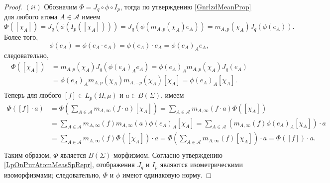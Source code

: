 \documentclass[12pt]{article}
\begin{document}
\begin{proof}
    $(ii)$ Обозначим $\Phi=J_q\circ \phi\circ I_p$, тогда по 
    утверждению \ref{GnrlzdMeanProp} для любого атома $A\in\mathcal{A}$ имеем
    \[
        \Phi([\chi_A])
        =J_q(\phi(I_p([\chi_A])))
        =J_q(\phi(m_{A,p}(\chi_A)e_A))
        =m_{A,p}(\chi_A)J_q(\phi(e_A)).
    \]
    Более того,
    \[
        \phi(e_A)
        =\phi(e_A\cdot e_A)
        =\phi(e_A)\cdot e_A
        =\phi(e_A)_A e_A,
    \]
    следовательно,
    \[
    \begin{aligned}
        \Phi([\chi_A])
        &=m_{A,p}(\chi_A)J_q(\phi(e_A)_A e_A) 
        =\phi(e_A)_A m_{A,p}(\chi_A)J_q( e_A) \\
        &=\phi(e_A)_A m_{A,p}(\chi_A)m_{A,-p}(\chi_A) [\chi_A] 
        =\phi(e_A)_A [\chi_A]. \\
    \end{aligned}
    \]
    Теперь для любого $[f]\in L_p(\Omega, \mu)$ и $a\in B(\Sigma)$, имеем
    \[
    \begin{aligned}
        \Phi([f]\cdot a)
        &=\Phi\left(
            \sum_{A\in\mathcal{A}} m_{A,\infty}(f\cdot a)[\chi_A]
        \right) 
        =\sum_{A\in\mathcal{A}} m_{A,\infty}(f\cdot a) \Phi([\chi_A]) \\
        &=\sum_{A\in\mathcal{A}} 
            m_{A,\infty}(f) m_{A,\infty}(a) \phi(e_A)_A [\chi_A] 
        =\sum_{A\in\mathcal{A}} 
            (m_{A,\infty}(f) \phi(e_A)_A [\chi_A])\cdot a \\
        &=\sum_{A\in\mathcal{A}} 
            m_{A,\infty}(f) \Phi([\chi_A])\cdot a 
        =\Phi\left(\sum_{A\in\mathcal{A}} 
            m_{A,\infty}(f) [\chi_A]\right)\cdot a 
        =\Phi([f])\cdot a. \\
    \end{aligned}
    \]
    Таким образом, $\Phi$ является $B(\Sigma)$-морфизмом. Согласно 
    утверждению \ref{LpOnPurAtomMeasSpRepr}, отображения $J_q$ и $I_p$ являются 
    изометрическими изоморфизмами; следовательно, $\Phi$ и $\phi$ имеют 
    одинаковую норму.
\end{proof}
\end{document}
